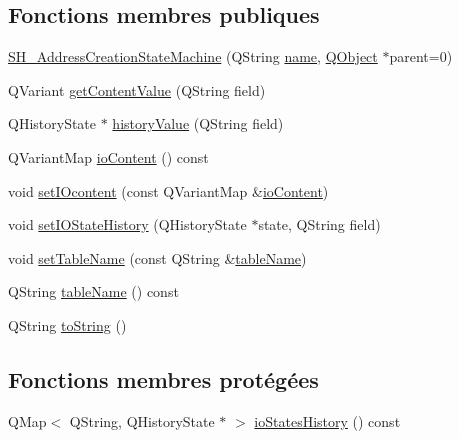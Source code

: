 \subsection*{Fonctions membres publiques}
\begin{DoxyCompactItemize}
\item 
\hyperlink{classSH__AddressCreationStateMachine_aabbda0fa01d5a59aaff1bd0e7153386d}{S\-H\-\_\-\-Address\-Creation\-State\-Machine} (Q\-String \hyperlink{classSH__NamedObject_a970f265df31b28b2179bbbceb6170ac2}{name}, \hyperlink{classQObject}{Q\-Object} $\ast$parent=0)
\item 
Q\-Variant \hyperlink{classSH__InOutStateMachine_a2cdd914f1e597ac52d021106eec75c89}{get\-Content\-Value} (Q\-String field)
\item 
Q\-History\-State $\ast$ \hyperlink{classSH__InOutStateMachine_a84fb2b2c2105cae9c590c0d15960854a}{history\-Value} (Q\-String field)
\item 
Q\-Variant\-Map \hyperlink{classSH__InOutStateMachine_a79b456cb2e353cb61ef9fe19c97fc8fb}{io\-Content} () const 
\item 
void \hyperlink{classSH__InOutStateMachine_a23a925522339132a51d16a7cff9074b9}{set\-I\-Ocontent} (const Q\-Variant\-Map \&\hyperlink{classSH__InOutStateMachine_a79b456cb2e353cb61ef9fe19c97fc8fb}{io\-Content})
\item 
void \hyperlink{classSH__InOutStateMachine_a4b72e6da839782a211692a4d728c3925}{set\-I\-O\-State\-History} (Q\-History\-State $\ast$state, Q\-String field)
\item 
void \hyperlink{classSH__InOutStateMachine_a437a730d07ddd15bd96314ab0b6cf40e}{set\-Table\-Name} (const Q\-String \&\hyperlink{classSH__InOutStateMachine_a18b07a985695100612bbcbda870933b4}{table\-Name})
\item 
Q\-String \hyperlink{classSH__InOutStateMachine_a18b07a985695100612bbcbda870933b4}{table\-Name} () const 
\item 
Q\-String \hyperlink{classSH__InOutStateMachine_a60ecd7de03d948e2d1e9cbedb5c3e5fa}{to\-String} ()
\end{DoxyCompactItemize}
\subsection*{Fonctions membres protégées}
\begin{DoxyCompactItemize}
\item 
Q\-Map$<$ Q\-String, Q\-History\-State $\ast$ $>$ \hyperlink{classSH__InOutStateMachine_a4ec3ebb4c40ea57c63afdf5976e62a94}{io\-States\-History} () const 
\end{DoxyCompactItemize}
